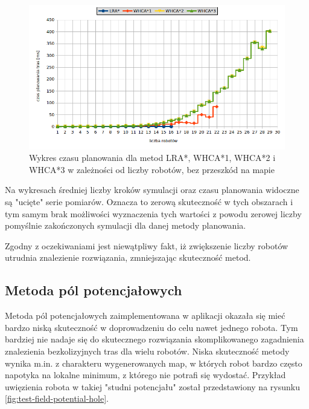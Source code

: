 \begin{figure}
	\centering
	\includegraphics[width=0.8\columnwidth]{img/plots/test-steps-empty-robots-calctime}
	\caption{Wykres czasu planowania dla metod LRA*, WHCA*1, WHCA*2 i WHCA*3 w zależności od liczby robotów, bez przeszkód na mapie}
	\label{fig:test-steps-empty-robots-calctime}
\end{figure}

Na wykresach średniej liczby kroków symulacji oraz czasu planowania widoczne są "ucięte" serie pomiarów. Oznacza to zerową skuteczność w tych obszarach i tym samym brak możliwości wyznaczenia tych wartości z powodu zerowej liczby pomyślnie zakończonych symulacji dla danej metody planowania.

Zgodny z oczekiwaniami jest niewątpliwy fakt, iż zwiększenie liczby robotów utrudnia znalezienie rozwiązania, zmniejszając skuteczność metod.

\subsection{Metoda pól potencjałowych}
Metoda pól potencjałowych zaimplementowana w aplikacji okazała się mieć bardzo niską skuteczność w doprowadzeniu do celu nawet jednego robota.
Tym bardziej nie nadaje się do skutecznego rozwiązania skomplikowanego zagadnienia znalezienia bezkolizyjnych tras dla wielu robotów.
Niska skuteczność metody wynika m.in. z charakteru wygenerowanych map, w których robot bardzo często napotyka na lokalne minimum, z którego nie potrafi się wydostać.
Przykład uwięzienia robota w takiej "studni potencjału" został przedstawiony na rysunku \ref{fig:test-field-potential-hole}.

